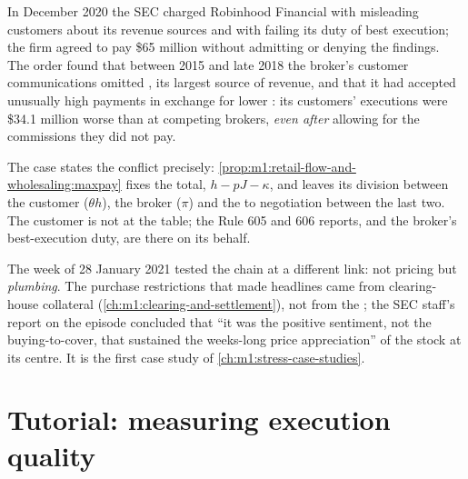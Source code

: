 \begin{example}\label{ex:m1:retail-flow-and-wholesaling:case}
In December 2020 the SEC charged Robinhood Financial with misleading
customers about its revenue sources and with failing its duty of best
execution; the firm agreed to pay \$65 million without admitting or denying
the findings. The order found that between 2015 and late 2018 the broker's
customer communications omitted , its largest source
of revenue, and that it had accepted unusually high payments in exchange for
lower : its customers' executions were \$34.1 million worse
than at competing brokers, \emph{even after} allowing for the commissions
they did not pay.
\end{example}

The case states the conflict precisely: \cref{prop:m1:retail-flow-and-wholesaling:maxpay}
fixes the total, $h - pJ - \kappa$, and leaves its division between the
customer ($\theta h$), the broker ($\pi$) and the  to negotiation
between the last two. The customer is not at the table; the Rule 605 and 606
reports, and the broker's best-execution duty, are there on its behalf.

The week of 28 January 2021 tested the chain at a different link: not
pricing but \emph{plumbing}. The purchase restrictions that made headlines
came from clearing-house collateral (\cref{ch:m1:clearing-and-settlement}),
not from the ; the SEC staff's report on the episode concluded
that ``it was the positive sentiment, not the buying-to-cover, that sustained
the weeks-long price appreciation'' of the stock at its centre.
It is the first case study of \cref{ch:m1:stress-case-studies}.

\section{Tutorial: measuring execution quality}\label{tut:m1:retail-flow-and-wholesaling:execq}

